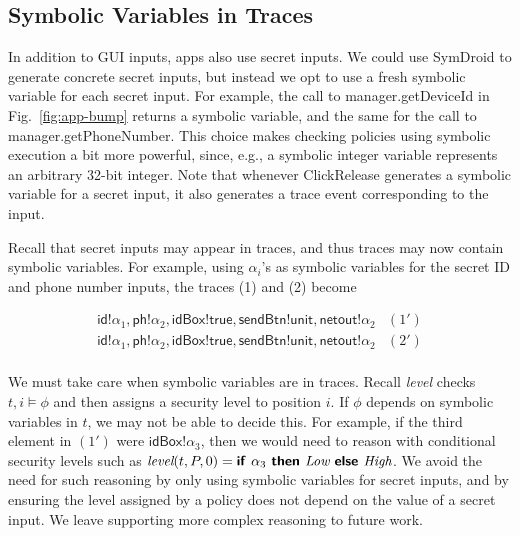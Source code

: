 \documentclass{llncs}
\newcommand{\code}[1]{\textsf{#1}} \newcommand{\bcode}[1]{\texttt{#1}}
\newcommand{\toolname}{ClickRelease\xspace}
\newcommand{\tr}{t\xspace}
\newcommand{\tlevel}[3]{\textit{level}(#1, #2, #3)}
\begin{document}
\subsection{Symbolic Variables in Traces}
\label{sec:symbolic-traces}

In addition to GUI inputs, apps also use secret inputs. We could use
SymDroid to generate concrete secret inputs, but instead we opt to use
a fresh symbolic variable for each secret input. For example, the call
to \code{manager.getDeviceId} in Fig.~\ref{fig:app-bump} returns a
symbolic variable, and the same for the call to
\code{manager.getPhoneNumber}. This choice makes checking policies
using symbolic execution a bit more powerful, since, e.g., a symbolic
integer variable represents an arbitrary 32-bit integer. Note that
whenever \toolname generates a symbolic variable for a secret input, it
also generates a trace event corresponding to the input.

Recall that secret inputs may appear in traces, and thus traces may
now contain symbolic variables. For example, using $\alpha_i$'s as
symbolic variables for the secret ID and phone number inputs, the
traces (1) and (2) become

\begin{displaymath}
  \begin{array}{cl}
    \code{id}!\alpha_1, \code{ph}!\alpha_2, \code{idBox}!\code{true},
    \code{sendBtn}!\code{unit}, \code{netout}!\alpha_2 & (1') \\
    \code{id}!\alpha_1, \code{ph}!\alpha_2, \code{idBox}!\code{true},
    \code{sendBtn}!\code{unit}, \code{netout}!\alpha_2 & (2') \\
  \end{array}
\end{displaymath}

We must take care when symbolic variables are in traces.
Recall \textit{level} checks $t,i \models \phi$ and
then assigns a security level to position $i$. If $\phi$
depends on symbolic variables in $t$, we may not be able to
decide this. For example, if the third element in $(1')$ were
$\code{idBox}!\alpha_3$, then we would need to reason with
conditional security levels such as
$\tlevel{\tr}{P}{0} =\textsf{\textbf{if }} \alpha_3 \textsf{\textbf{ then }} \textit{Low}
\textsf{\textbf{ else }} \textit{High}$. We
avoid the need for such reasoning by only using symbolic variables for
secret inputs, and by ensuring the level assigned by a policy does not
depend on the value of a secret input. We leave supporting more complex
reasoning to future work.
\end{document}
